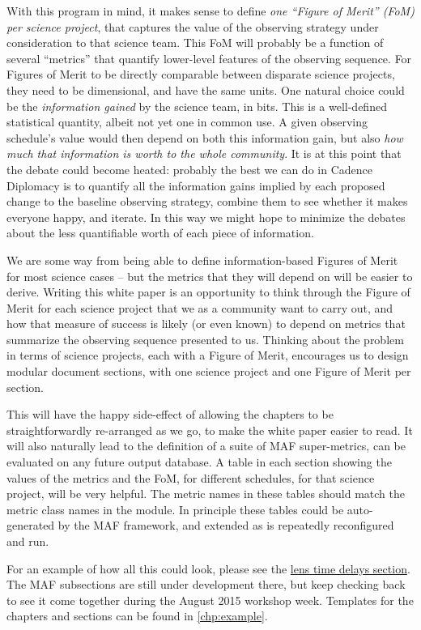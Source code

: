 With this program in mind, it makes sense to define {\it one ``Figure
of Merit'' (FoM) per science project}, that captures the value of  the
observing strategy under consideration to that science team. This FoM
will probably be a function of several ``metrics'' that quantify
lower-level features of the observing sequence.  For Figures of Merit
to be directly comparable between disparate science projects,  they
need to be dimensional, and have the same units. One natural
choice could be the {\it information gained} by the science team, in
bits. This is a well-defined statistical quantity, albeit not yet one
in common use. A given observing schedule's value would then depend on
both this information gain, but also {\it how much that information is
worth to the whole community}. It is at this point that the debate
could become heated: probably the best we can do in Cadence Diplomacy
is to quantify all the information gains implied by each proposed
change to the baseline  observing strategy, combine them to see
whether it makes everyone happy, and iterate. In this way we might
hope to minimize the debates about the less quantifiable worth of each
piece of information.

We are some way from being able to define information-based Figures of
Merit for most science cases -- but the metrics that they will depend
on will be easier to derive. Writing this white paper is an
opportunity to think through the Figure of Merit for each science
project that we as a community want to carry out, and how that measure
of success is likely (or even known) to depend on metrics that
summarize the observing sequence presented to us. Thinking about the
problem in terms of science projects, each with a  Figure of Merit,
encourages us to design modular document sections, with one science
project and one Figure of Merit per section.

This will have the happy side-effect of allowing the chapters to be
straightforwardly re-arranged as we go, to make the white paper easier
to read. It will also naturally lead to the definition of a suite of
MAF  super-metrics, can be evaluated on any future \OpSim output
database.  A table in each section showing the values of the metrics
and the FoM, for different schedules, for that science project, will
be very helpful. The metric names in these tables should match the
metric class names in the
\href{https://github.com/LSST-nonproject/sims_maf_contrib/wiki}{\simsMafContrib}
module. In principle these tables could be auto-generated by the MAF
framework, and extended as \OpSim is repeatedly reconfigured and run.

For an example of how all this could look, please see the
\hyperref[sec:lenstimedelays]{lens
time delays section}. The MAF subsections are still under development
there, but keep checking back to see it come together during the
August 2015 workshop week. Templates for the chapters and sections can
be found in \autoref{chp:example}.


\navigationbar

